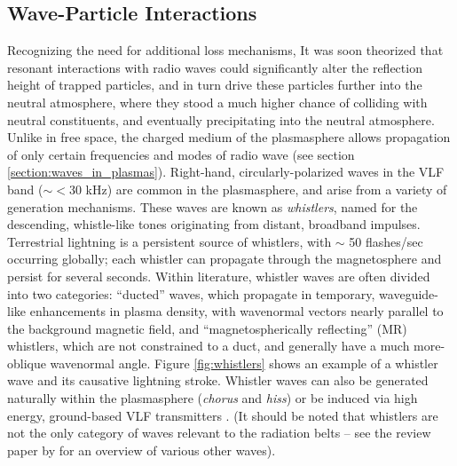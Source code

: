 \subsection{Wave-Particle Interactions}
Recognizing the need for additional loss mechanisms, It was soon theorized that resonant interactions with radio waves could significantly alter the reflection height of trapped particles, and in turn drive these particles further into the neutral atmosphere, where they stood a much higher chance of colliding with neutral constituents, and eventually precipitating into the neutral atmosphere. Unlike in free space, the charged medium of the plasmasphere allows propagation of only certain frequencies and modes of radio wave (see section \ref{section:waves_in_plasmas}). Right-hand, circularly-polarized waves in the VLF band ($\sim < 30 $ kHz) are common in the plasmasphere, and arise from a variety of generation mechanisms. These waves are known as \emph{whistlers}, named for the descending, whistle-like tones originating from distant, broadband impulses. Terrestrial lightning is a persistent source of whistlers, with $\sim$ 50 flashes/sec occurring globally; each whistler can propagate through the magnetosphere and persist for several seconds. Within literature, whistler waves are often divided into two categories: ``ducted'' waves, which propagate in temporary, waveguide-like enhancements in plasma density, with wavenormal vectors nearly parallel to the background magnetic field, and ``magnetospherically reflecting'' (MR) whistlers, which are not constrained to a duct, and generally have a much more-oblique wavenormal angle. Figure \ref{fig:whistlers} shows an example of a whistler wave and its causative lightning stroke. 
Whistler waves can also be generated naturally within the plasmasphere (\emph{chorus} and \emph{hiss}) or be induced via high energy, ground-based VLF transmitters \citep{Graf2013}. (It should be noted that whistlers are not the only category of waves relevant to the radiation belts -- see the review paper by \cite{Thorne2010a} for an overview of various other waves).

